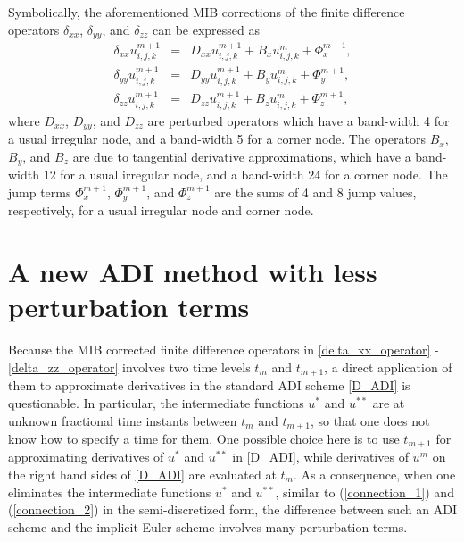 \documentclass[dissertation]{uathesis}
\begin{document}
\begin{body}
\begin{flushleft}
\hspace{1cm} Symbolically, the aforementioned MIB corrections of the finite difference operators $\delta_{xx}$, $\delta_{yy}$, and $\delta_{zz}$ can be expressed as \cite{zhao2015matched,li2017matched}
%
\begin{eqnarray} 
\delta_{xx} u^{m+1}_{i,j,k} &=& D_{xx} u^{m+1}_{i,j,k} + B_{x} u^{m}_{i,j,k} + \Phi_{x}^{m+1}, \label{delta_xx_operator} \\ 
\delta_{yy} u^{m+1}_{i,j,k} &=& D_{yy} u^{m+1}_{i,j,k} + B_{y} u^{m}_{i,j,k} + \Phi_{y}^{m+1}, \label{delta_yy_operator} \\
\delta_{zz} u^{m+1}_{i,j,k} &=& D_{zz} u^{m+1}_{i,j,k} + B_{z} u^{m}_{i,j,k} + \Phi_{z}^{m+1}, \label{delta_zz_operator}
\end{eqnarray}
%
where $D_{xx}$, $D_{yy}$, and $D_{zz}$ are perturbed operators which have a band-width 4 for a usual irregular node, and a band-width 5 for a corner node. The operators $B_{x}$, $B_{y}$, and $B_{z}$ are due to tangential derivative approximations, which have a band-width 12 for a usual irregular node, and a band-width 24 for a corner node. The jump terms $\Phi^{m+1}_{x}$, $\Phi^{m+1}_{y}$, and $\Phi^{m+1}_{z}$ are the sums of 4 and 8 jump values, respectively, for a usual irregular node and corner node.

\section{A new ADI method with less perturbation terms}
\hspace{1cm} Because the MIB corrected finite difference operators in \eqref{delta_xx_operator}  - 
\eqref{delta_zz_operator} involves two time levels $t_m$ and $t_{m+1}$, a direct application of them to approximate derivatives in the standard ADI scheme \eqref{D_ADI} is questionable. In particular, the intermediate functions $u^*$ and $u^{**}$ are at unknown fractional time instants between  $t_m$ and $t_{m+1}$, so that one does not know how to specify a time for them. One possible choice here is to use $t_{m+1}$ for approximating derivatives of $u^*$ and $u^{**}$ in \eqref{D_ADI}, while derivatives of $u^m$ on the right hand sides of \eqref{D_ADI} are evaluated at $t_m$. As a consequence, when one eliminates the intermediate functions $u^*$ and $u^{**}$, similar to (\ref{connection_1}) and (\ref{connection_2}) in the semi-discretized form, the difference between such an ADI scheme and the implicit Euler scheme involves many perturbation terms. 


\end{flushleft}
\end{body}
\end{document}
